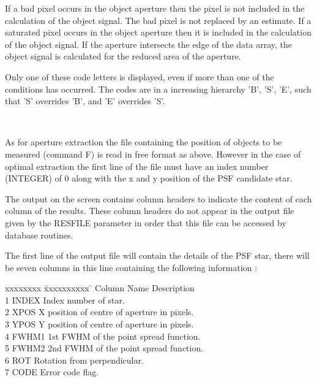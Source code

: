 \documentclass[twoside,11pt]{article}
\renewcommand{\_}{\texttt{\symbol{95}}}
\newcommand{\sstsubsection}[1]{ \item[{#1}] \mbox{} \\}
\newcommand{\sstsubsection}[1]{\item[{#1}]}
\begin{document}
{{   If a bad pixel occurs in the object aperture then the pixel is not
   included in the calculation of the object signal. The bad pixel is not
   replaced by an estimate. If a saturated pixel occurs in the object
   aperture then it is included in the calculation of the object signal.
   If the aperture intersects the edge of the data array, the object signal
   is calculated for the reduced area of the aperture.

   Only one of these code letters is displayed, even if more than one of the
   conditions has occurred. The codes are in a increasing hierarchy 'B', 'S',
   'E', such that 'S' overrides 'B', and 'E' overrides 'S'.
   }

   \sstsubsection{
      Optimal  Extraction -- Format of Associated Files:
    } {
    
   As for aperture extraction the file containing the position of objects
   to be measured (command F) is read in free format as above. However in 
   the case of optimal extraction the first line of the file must have an
   index number (INTEGER) of 0 along with the x and y position of the PSF
   candidate star. 
    
   The output on the screen contains column headers to indicate the content of
   each column of the results. These column headers do not appear in the
   output file given by the RESFILE parameter in order that this file can be
   accessed by database routines.

   The first line of the output file will contain the details of the PSF star,
   there will be seven columns in this line containing the following information :

   \begin{tabbing}
   xxxxxxxx \= xxxxxxxxxx \= \kill
   Column \> Name  \> Description \\
    1 \> INDEX \> Index number of star.\\
    2 \> XPOS \> X position of centre of aperture in pixels.\\
    3 \> YPOS \> Y position of centre of aperture in pixels.\\   
    4 \> FWHM1 \> 1st FWHM of the point spread function.\\
    5 \> FWHM2 \> 2nd FWHM of the point spread function.\\
    6 \> ROT \> Rotation from perpendicular.\\
    7 \> CODE \> Error code flag.\\
   \end{tabbing}

}}
\end{document}
